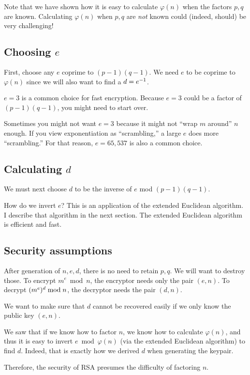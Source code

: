 \begin{remark}
  Note that we have shown how it is easy to calculate $\varphi(n)$ when
  the factors $p, q$ are known. Calculating $\varphi(n)$ when $p, q$ are
  \emph{not} known could (indeed, should) be very challenging!
\end{remark}

\subsection{Choosing $e$}

First, choose any $e$ coprime to $(p - 1) (q - 1)$. We need $e$ to be
coprime to $\varphi(n)$ since we will also want to find a $d = {e}^{-1}$.

$e = 3$ is a common choice for fast encryption. Because $e = 3$ could be
a factor of $(p - 1)(q - 1)$, you might need to start over.

Sometimes you might not want $e = 3$ because it might not ``wrap $m$
around'' $n$ enough. If you view exponentiation as ``scrambling,'' a
large $e$ does more ``scrambling.'' For that reason, $e = 65,537$ is
also a common choice.

\subsection{Calculating $d$}

We must next choose $d$ to be the inverse of $e$ mod $(p - 1) (q - 1)$.

How do we invert $e$? This is an application of the extended Euclidean
algorithm. I describe that algorithm in the next section. The extended
Euclidean algorithm is efficient and fast.

\subsection{Security assumptions}

\begin{remark}
  After generation of $n, e, d$, there is no need to retain $p, q$. We
  will want to destroy those. To encrypt $m^e \bmod n$, the encryptor
  needs only the pair $(e, n)$. To decrypt $\mathopen{}\left( {m^e} \right)\mathclose{}^d \bmod n$, the
  decryptor needs the pair $(d, n)$.
\end{remark}

\begin{remark}
  We want to make sure that $d$ cannot be recovered easily if we only
  know the public key $(e, n)$.

  We saw that if we know how to factor $n$, we know how to calculate
  $\varphi(n)$, and thus it is easy to invert $e \bmod \varphi(n)$ (via
  the extended Euclidean algorithm) to find $d$. Indeed, that is exactly
  how we derived $d$ when generating the keypair.

  Therefore, the security of RSA presumes the difficulty of factoring
  $n$.
\end{remark}

